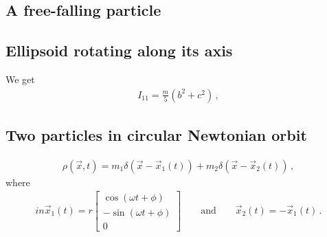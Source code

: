\documentclass[main.tex]{subfiles}
\begin{document}

%

\subsection{A free-falling particle}



\subsection{Ellipsoid rotating along its axis}

We get 
%
\begin{align}
I_{11} = \frac{m}{5} (b^2 + c^2)
\,,
\end{align}
%


\subsection{Two particles in circular Newtonian orbit}

%
\begin{align}
\rho (\vec{x}, t) = m_1 \delta (\vec{x} - \vec{x}_1(t)) + m_2 \delta (\vec{x} - \vec{x}_2 (t))                                                                        
\,,
\end{align}
%
where 
%
\begin{align}in
\vec{x}_1 (t) = r \left[\begin{array}{c}
\cos(\omega t + \phi ) \\ 
- \sin(\omega t + \phi ) \\ 
0
\end{array}\right]
\qquad \text{and} \qquad
\vec{x}_2 (t) = - \vec{x}_1 (t)
\,.
\end{align}
\end{document}
